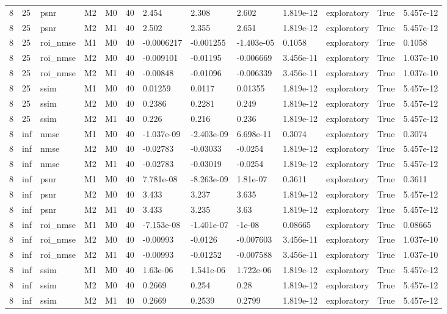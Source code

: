 \begin{tabular}{lllllllllllll}
8 & 25 & psnr & M2 & M0 & 40 & 2.454 & 2.308 & 2.602 & 1.819e-12 & exploratory & True & 5.457e-12 \\
8 & 25 & psnr & M2 & M1 & 40 & 2.502 & 2.355 & 2.651 & 1.819e-12 & exploratory & True & 5.457e-12 \\
8 & 25 & roi\_nmse & M1 & M0 & 40 & -0.0006217 & -0.001255 & -1.403e-05 & 0.1058 & exploratory & True & 0.1058 \\
8 & 25 & roi\_nmse & M2 & M0 & 40 & -0.009101 & -0.01195 & -0.006669 & 3.456e-11 & exploratory & True & 1.037e-10 \\
8 & 25 & roi\_nmse & M2 & M1 & 40 & -0.00848 & -0.01096 & -0.006339 & 3.456e-11 & exploratory & True & 1.037e-10 \\
8 & 25 & ssim & M1 & M0 & 40 & 0.01259 & 0.0117 & 0.01355 & 1.819e-12 & exploratory & True & 5.457e-12 \\
8 & 25 & ssim & M2 & M0 & 40 & 0.2386 & 0.2281 & 0.249 & 1.819e-12 & exploratory & True & 5.457e-12 \\
8 & 25 & ssim & M2 & M1 & 40 & 0.226 & 0.216 & 0.236 & 1.819e-12 & exploratory & True & 5.457e-12 \\
8 & inf & nmse & M1 & M0 & 40 & -1.037e-09 & -2.403e-09 & 6.698e-11 & 0.3074 & exploratory & True & 0.3074 \\
8 & inf & nmse & M2 & M0 & 40 & -0.02783 & -0.03033 & -0.0254 & 1.819e-12 & exploratory & True & 5.457e-12 \\
8 & inf & nmse & M2 & M1 & 40 & -0.02783 & -0.03019 & -0.0254 & 1.819e-12 & exploratory & True & 5.457e-12 \\
8 & inf & psnr & M1 & M0 & 40 & 7.781e-08 & -8.263e-09 & 1.81e-07 & 0.3611 & exploratory & True & 0.3611 \\
8 & inf & psnr & M2 & M0 & 40 & 3.433 & 3.237 & 3.635 & 1.819e-12 & exploratory & True & 5.457e-12 \\
8 & inf & psnr & M2 & M1 & 40 & 3.433 & 3.235 & 3.63 & 1.819e-12 & exploratory & True & 5.457e-12 \\
8 & inf & roi\_nmse & M1 & M0 & 40 & -7.153e-08 & -1.401e-07 & -1e-08 & 0.08665 & exploratory & True & 0.08665 \\
8 & inf & roi\_nmse & M2 & M0 & 40 & -0.00993 & -0.0126 & -0.007603 & 3.456e-11 & exploratory & True & 1.037e-10 \\
8 & inf & roi\_nmse & M2 & M1 & 40 & -0.00993 & -0.01252 & -0.007588 & 3.456e-11 & exploratory & True & 1.037e-10 \\
8 & inf & ssim & M1 & M0 & 40 & 1.63e-06 & 1.541e-06 & 1.722e-06 & 1.819e-12 & exploratory & True & 5.457e-12 \\
8 & inf & ssim & M2 & M0 & 40 & 0.2669 & 0.254 & 0.28 & 1.819e-12 & exploratory & True & 5.457e-12 \\
8 & inf & ssim & M2 & M1 & 40 & 0.2669 & 0.2539 & 0.2799 & 1.819e-12 & exploratory & True & 5.457e-12 \\
\hline
\end{tabular}
